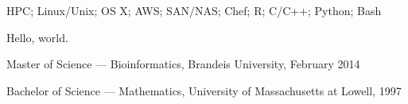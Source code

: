 \documentclass[11pt,article,oneside]{memoir}
\begin{document}
\medskip

\reversemarginpar

\bigskip


\ind HPC; Linux/Unix; OS X; AWS; SAN/NAS; Chef; R; C/C++; Python; Bash

\bigskip

{}

Hello, world.\\

\bigskip



\ind Master of Science --- Bioinformatics, Brandeis University, February 2014

\ind Bachelor of Science --- Mathematics, University of Massachusetts at Lowell, 1997
\end{document}
